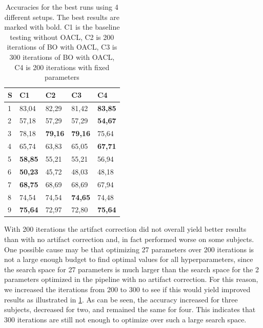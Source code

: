 \begin{table}[H]
	\begin{tabular}{@{}l|llll@{}} \toprule
		S					  & C1             & C2             & C3             & C4             \\ \midrule
		1                     & 83,04          & 82,29          & 81,42          & \textbf{83,85} \\
		2                     & 57,18          & 57,29          & 57,29          & \textbf{54,67} \\
		3                     & 78,18          & \textbf{79,16} & \textbf{79,16} & 75,64          \\
		4                     & 65,74          & 63,83          & 65,05          & \textbf{67,71} \\
		5                     & \textbf{58,85} & 55,21          & 55,21          & 56,94          \\
		6                     & \textbf{50,23} & 45,72          & 48,03          & 48,18          \\
		7                     & \textbf{68,75} & 68,69          & 68,69          & 67,94          \\
		8                     & 74,54          & 74,54          & \textbf{74,65} & 74,48          \\
		9                     & \textbf{75,64} & 72,97          & 72,80          & \textbf{75,64} \\ \bottomrule
	\end{tabular}
	\centering
	\caption{Accuracies for the best runs using 4 different setups. The best results are marked with bold. C1 is the baseline testing without OACL, C2 is 200 iterations of BO with OACL, C3 is 300 iterations of BO with OACL, C4 is 200 iterations with fixed parameters}
	\label{fig:results}
\end{table}

With 200 iterations the artifact correction did not overall yield better results than with no artifact correction and, in fact performed worse on some subjects. One possible cause may be that optimizing 27 parameters over 200 iterations is not a large enough budget to find optimal values for all hyperparameters, since the search space for 27 parameters is much larger than the search space for the 2 parameters optimized in the pipeline with no artifact correction. For this reason, we increased the iterations from 200 to 300 to see if this would yield improved results as illustrated in \cref{fig:results}. As can be seen, the accuracy increased for three subjects, decreased for two, and remained the same for four. This indicates that 300 iterations are still not enough to optimize over such a large search space.

